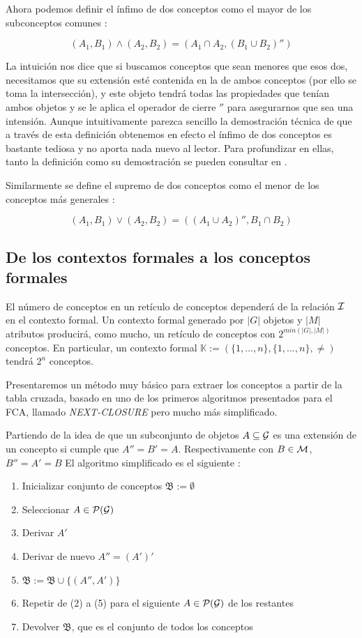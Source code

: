 \documentclass[oneside,openright,titlepage,numbers=noenddot,openany,headinclude,footinclude=true,
cleardoublepage=empty,abstractoff,BCOR=5mm,paper=a4,fontsize=12pt,main=spanish]{scrreprt}
\begin{document}
Ahora podemos definir el ínfimo de dos conceptos como el mayor de los subconceptos comunes \cite{conceptualexploration}:

$$(A_1,B_1) \wedge (A_2,B_2)=(A_1 \cap A_2,(B_1\cup B_2)'')$$

La intuición nos dice que si buscamos conceptos que sean menores que esos dos, necesitamos que su extensión esté contenida en la de ambos conceptos (por ello se toma la intersección), y este objeto tendrá todas las propiedades que tenían ambos objetos y se le aplica el operador de cierre $''$ para asegurarnos que sea una intensión. Aunque intuitivamente parezca sencillo la demostración técnica de que a través de esta definición obtenemos en efecto el ínfimo de dos conceptos es bastante tediosa y no aporta nada nuevo al lector. Para profundizar en ellas, tanto la definición como su demostración se pueden consultar en \cite{conceptualexploration}.

Similarmente se define el supremo de dos conceptos como el menor de los conceptos más generales \cite{conceptualexploration}:

$$(A_1,B_1) \vee (A_2,B_2)=((A_1 \cup A_2)'',B_1 \cap B_2)$$




\subsection{De los contextos formales a los conceptos formales}

El número de conceptos en un retículo de conceptos dependerá de la relación $\mathcal{I}$ en el contexto formal. Un contexto formal generado por $|G|$ objetos y $|M|$ atributos producirá, como mucho, un retículo de conceptos con $2^{min(|G|,|M|)}$ conceptos. En particular, un contexto formal $\mathbb{K}:= (\{1,...,n\},\{1,...,n\}, \neq)$ tendrá $2^{n}$ conceptos.

Presentaremos un método muy básico para extraer los conceptos a partir de la tabla cruzada, basado en uno de los primeros algoritmos presentados para el FCA, llamado \textit{NEXT-CLOSURE} \cite{Ganter} pero mucho más simplificado.

Partiendo de la idea de que un subconjunto de objetos $A\subseteq \mathcal{G}$ es una extensión de un concepto si cumple que $A''=B'=A$. Respectivamente con $B\in \mathcal{M}$, $B''=A'=B$ El algoritmo simplificado es el siguiente \cite{inforetrieval}:

\begin{enumerate}
    \item Inicializar conjunto de conceptos $\mathfrak{B}:=\emptyset$
    \item Seleccionar $A \in \mathcal{P}(\mathcal{G})$
    \item Derivar $A'$
    \item Derivar de nuevo $A''= (A')'$
    \item $\mathfrak{B}:=\mathfrak{B}\cup \{(A'',A')\}$
    \item Repetir de (2) a (5) para el siguiente $A \in \mathcal{P}(\mathcal{G})$ de los restantes
    \item Devolver $\mathfrak{B}$, que es el conjunto de todos los conceptos
\end{enumerate}
\end{document}
